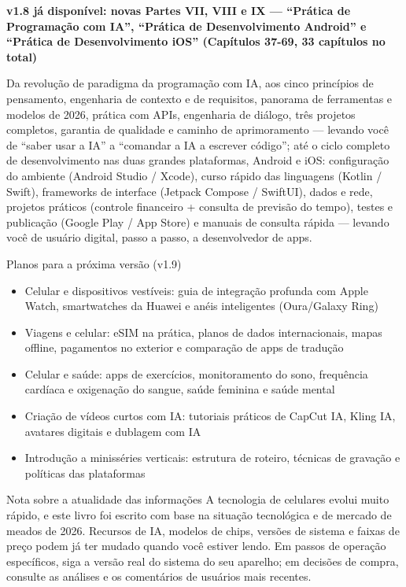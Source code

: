 

\textbf{v1.8 já disponível: novas Partes VII, VIII e IX — “Prática de Programação com IA”, “Prática de Desenvolvimento Android” e “Prática de Desenvolvimento iOS” (Capítulos 37-69, 33 capítulos no total)}\par

Da revolução de paradigma da programação com IA, aos cinco princípios de pensamento, engenharia de contexto e de requisitos, panorama de ferramentas e modelos de 2026, prática com APIs, engenharia de diálogo, três projetos completos, garantia de qualidade e caminho de aprimoramento — levando você de “saber usar a IA” a “comandar a IA a escrever código”; até o ciclo completo de desenvolvimento nas duas grandes plataformas, Android e iOS: configuração do ambiente (Android Studio / Xcode), curso rápido das linguagens (Kotlin / Swift), frameworks de interface (Jetpack Compose / SwiftUI), dados e rede, projetos práticos (controle financeiro + consulta de previsão do tempo), testes e publicação (Google Play / App Store) e manuais de consulta rápida — levando você de usuário digital, passo a passo, a desenvolvedor de apps.

\begin{tcbinfo}{Planos para a próxima versão (v1.9)}
\begin{itemize}
  \item Celular e dispositivos vestíveis: guia de integração profunda com Apple Watch, smartwatches da Huawei e anéis inteligentes (Oura/Galaxy Ring)
  \item Viagens e celular: eSIM na prática, planos de dados internacionais, mapas offline, pagamentos no exterior e comparação de apps de tradução
  \item Celular e saúde: apps de exercícios, monitoramento do sono, frequência cardíaca e oxigenação do sangue, saúde feminina e saúde mental
  \item Criação de vídeos curtos com IA: tutoriais práticos de CapCut IA, Kling IA, avatares digitais e dublagem com IA
  \item Introdução a minisséries verticais: estrutura de roteiro, técnicas de gravação e políticas das plataformas
\end{itemize}

\end{tcbinfo}

\begin{tcbwarn}{Nota sobre a atualidade das informações}
A tecnologia de celulares evolui muito rápido, e este livro foi escrito com base na situação tecnológica e de mercado de meados de 2026. Recursos de IA, modelos de chips, versões de sistema e faixas de preço podem já ter mudado quando você estiver lendo. Em passos de operação específicos, siga a versão real do sistema do seu aparelho; em decisões de compra, consulte as análises e os comentários de usuários mais recentes.

\end{tcbwarn}
